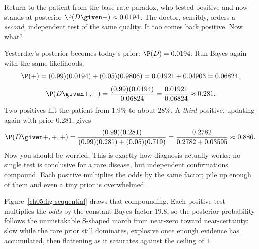 \begin{example}
\label{ch05:ex-second-test}
Return to the patient from the base-rate paradox, who tested positive and now stands at
posterior $\P(D \given +) \approx 0.0194$. The doctor, sensibly, orders a \emph{second},
independent test of the same quality. It too comes back positive. Now what?

Yesterday's posterior becomes today's prior: $\P(D) = 0.0194$. Run Bayes again with the
same likelihoods:
\[
  \P(+) = (0.99)(0.0194) + (0.05)(0.9806) = 0.01921 + 0.04903 = 0.06824,
\]
\[
  \P(D \given +,+) = \frac{(0.99)(0.0194)}{0.06824} = \frac{0.01921}{0.06824}
  \approx 0.281.
\]
Two positives lift the patient from $1.9\%$ to about $28\%$. A \emph{third} positive,
updating again with prior $0.281$, gives
\[
  \P(D\given +,+,+) = \frac{(0.99)(0.281)}{(0.99)(0.281)+(0.05)(0.719)}
  = \frac{0.2782}{0.2782+0.03595} \approx 0.886.
\]
Now you should be worried. This is exactly how diagnosis actually works: no single test
is conclusive for a rare disease, but independent confirmations compound. Each positive
multiplies the odds by the same factor; pile up enough of them and even a tiny prior is
overwhelmed.
\end{example}

Figure~\ref{ch05:fig-sequential} draws that compounding. Each positive test multiplies the
\emph{odds} by the constant Bayes factor $19.8$, so the posterior probability follows the
unmistakable S-shaped march from near-zero toward near-certainty: slow while the rare prior
still dominates, explosive once enough evidence has accumulated, then flattening as it
saturates against the ceiling of $1$.

